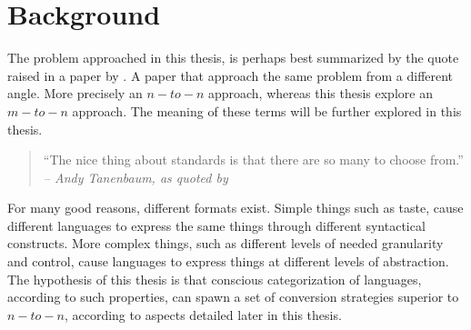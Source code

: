 \documentclass{scrreprt}
\begin{document}
%
%
%
%
%
%


\tableofcontents
\pagebreak











%
%
%
%
%
%










%
%
%
%
%
%

\chapter{Background}
The problem approached in this thesis, is perhaps best summarized by the quote raised in a paper by \citet{krijnen}. A paper that approach the same problem from a different angle. More precisely an $n-to-n$ approach, whereas this thesis explore an $m-to-n$ approach. The meaning of these terms will be further explored in this thesis.

\begin{quote}
``The nice thing about standards is that there are so many to choose from.''\\
\textit{-- Andy Tanenbaum, as quoted by \citet{krijnen}}
\end{quote}

For many good reasons, different formats exist. Simple things such as taste, cause different languages to express the same things through different syntactical constructs. More complex things, such as different levels of needed granularity and control, cause languages to express things at different levels of abstraction. The hypothesis of this thesis is that conscious categorization of languages, according to such properties, can spawn a set of conversion strategies superior to $n-to-n$, according to aspects detailed later in this thesis.
\end{document}
